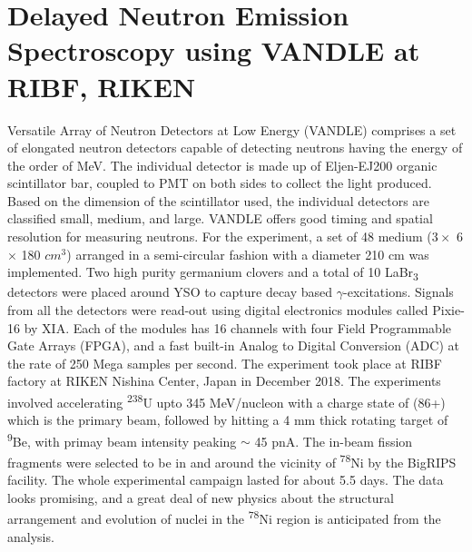 \section{Delayed Neutron Emission Spectroscopy using \textbf{VANDLE} at RIBF, RIKEN}
Versatile Array of Neutron Detectors at Low Energy (VANDLE) comprises a set of elongated neutron detectors capable of detecting neutrons having the energy of the order of MeV. The individual detector is made up of Eljen-EJ200 organic scintillator bar, coupled to PMT on both sides to collect the light produced. Based on the dimension of the scintillator used, the individual detectors are classified small, medium, and large. VANDLE offers good timing and spatial resolution \citep{VANDLE} for measuring neutrons. For the experiment, a set of 48 medium ($3 \times$ 6 $\times$ 180 $cm^{3}$) arranged in a semi-circular fashion with a diameter 210 cm was implemented. Two high purity germanium clovers and a total of 10 LaBr\textsubscript{3} detectors were placed around YSO to capture decay based $\gamma$-excitations. Signals from all the detectors were read-out using digital electronics modules called Pixie-16 \citep{PIXIE16} by XIA. Each of the modules has 16 channels with four Field Programmable Gate Arrays (FPGA), and a fast built-in Analog to Digital Conversion (ADC) at the rate of 250 Mega samples per second. The experiment took place at RIBF factory at RIKEN Nishina Center, Japan in December 2018. The experiments involved accelerating \textsuperscript{238}U upto 345 MeV/nucleon with a charge state of (86+) which is the primary beam, followed by hitting a 4 mm thick rotating target of \textsuperscript{9}Be, with primay beam intensity peaking $\sim$ 45 pnA. The in-beam fission fragments were selected to be in and around the vicinity of \textsuperscript{78}Ni by the BigRIPS \citep{FUKUDA2013323} facility. The whole experimental campaign lasted for about 5.5 days. The data looks promising, and a great deal of new physics about the structural arrangement and evolution of nuclei in the \textsuperscript{78}Ni region is anticipated from the analysis.

